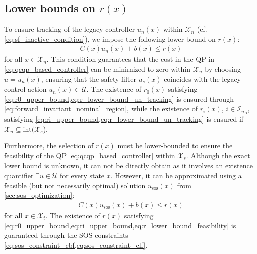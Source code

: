 \documentclass[lettersize,journal]{IEEEtran}
\newcommand{\afterReviewChangedBox}[1]{{\color{orange}#1}}
\begin{document}

\subsection{Lower bounds on $r(x)$}

\afterReviewChangedBox{To ensure tracking of the legacy controller $u_n(x)$ within $\mathcal X_n$ (cf. \cref{eq:sf_inactive_condition}), we impose the following lower bound on $r(x)$:
\begin{align} \label{eq:r_lower_bound_un_tracking}
   C(x) u_n(x) + b(x) \leq r(x)
\end{align}
for all $x \in \mathcal X_n$.
This condition guarantees that the cost in the QP in \cref{eq:qcqp_based_controller} can be minimized to zero within $\mathcal X_n$ by choosing $u = u_n(x)$, ensuring that the safety filter $u_s(x)$ coincides with the legacy control action $u_n(x) \in \mathcal U$.
The existence of $r_0(x)$ satisfying \cref{eq:r0_upper_bound,eq:r_lower_bound_un_tracking} is ensured through \cref{eq:forward_invariant_nominal_region}, while the existence of $r_i(x)$, $i \in \mathcal I_{n_{\!B}}$, satisfying \cref{eq:ri_upper_bound,eq:r_lower_bound_un_tracking} is ensured if $\mathcal X_n \subseteq \text{int}(\mathcal X_s$).}

\afterReviewChangedBox{Furthermore, the selection of $r(x)$ must be lower-bounded to ensure the feasibility of the QP \cref{eq:qcqp_based_controller} within $\mathcal X_s$.
Although the exact lower bound is unknown, it can not be directly obtain as it involves an existence quantifier $\exists u \in \mathcal U$ for every state $x$.
However, it can be approximated using a feasible (but not necessarily optimal) solution $u_\text{sos}(x)$ from \cref{sec:sos_optimization}:
\begin{align} \label{eq:r_lower_bound_feasibility}
   C(x) u_\text{sos}(x) + b(x) \leq r(x)
\end{align}
for all $x \in \mathcal X_t$.
The existence of $r(x)$ satisfying \cref{eq:r0_upper_bound,eq:ri_upper_bound,eq:r_lower_bound_feasibility} is guaranteed through the SOS constraints \cref{eq:sos_constraint_cbf,eq:sos_constraint_clf}.}
\end{document}

